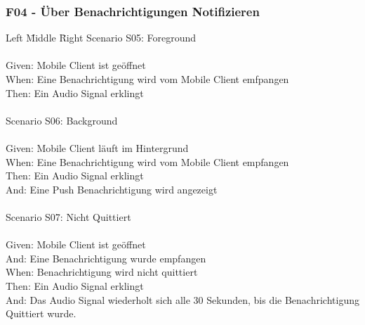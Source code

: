 \subsubsection*{F04 - Über Benachrichtigungen Notifizieren}
\begin{tabbing}
    Left \= Middle \= Right \kill
    Scenario S05: \> \>  Foreground\\ \\
    Given: \> \>   Mobile Client ist geöffnet\\
    When: \> \>    Eine Benachrichtigung wird vom Mobile Client emfpangen\\
    Then: \> \>    Ein Audio Signal erklingt\\
    \\
    Scenario S06: \> \>  Background\\ \\
    Given: \> \>   Mobile Client läuft im Hintergrund\\
    When: \> \>    Eine Benachrichtigung wird vom Mobile Client empfangen\\
    Then: \> \>    Ein Audio Signal erklingt\\
    And: \> \>     Eine Push Benachrichtigung wird angezeigt\\
    \\
    Scenario S07: \> \>  Nicht Quittiert\\ \\
    Given: \> \>   Mobile Client ist geöffnet\\
    And: \> \>     Eine Benachrichtigung wurde empfangen\\
    When: \> \>    Benachrichtigung wird nicht quittiert\\
    Then: \> \>    Ein Audio Signal erklingt\\
    And: \> \>     Das Audio Signal wiederholt sich alle 30 Sekunden, bis die Benachrichtigung Quittiert wurde.\\
\end{tabbing}

\clearpage

